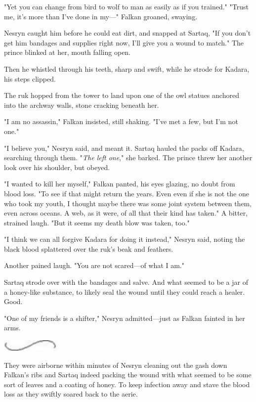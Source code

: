 "Yet you can change from bird to wolf to man as easily as if you trained." "Trust me, it's more than I've done in my---" Falkan groaned, swaying.

Nesryn caught him before he could eat dirt, and snapped at Sartaq, "If you don't get him bandages and supplies right now, I'll give you a wound to match." The prince blinked at her, mouth falling open.

Then he whistled through his teeth, sharp and swift, while he strode for Kadara, his steps clipped.

The ruk hopped from the tower to land upon one of the owl statues anchored into the archway walls, stone cracking beneath her.

"I am no assassin," Falkan insisted, still shaking. "I've met a few, but I'm not one."

"I believe you," Nesryn said, and meant it. Sartaq hauled the packs off Kadara, searching through them. "\emph{The left one}," she barked. The prince threw her another look over his shoulder, but obeyed.

"I wanted to kill her myself," Falkan panted, his eyes glazing, no doubt from blood loss. "To see if  that might return the years. Even  even if she is not the one who took my youth, I thought maybe there was some  joint system between them, even across oceans. A web, as it were, of all that their kind has taken." A bitter, strained laugh. "But it seems my death blow was taken, too."

"I think we can all forgive Kadara for doing it instead," Nesryn said, noting the black blood splattered over the ruk's beak and feathers.

Another pained laugh. "You are not scared---of what I am."

Sartaq strode over with the bandages and salve. And what seemed to be a jar of a honey-like substance, to likely seal the wound until they could reach a healer. Good.

"One of my friends is a shifter," Nesryn admitted---just as Falkan fainted in her arms.

\includegraphics[width=1.12in,height=0.24in]{images/seperator}

They were airborne within minutes of Nesryn cleaning out the gash down Falkan's ribs and Sartaq indeed packing the wound with what seemed to be some sort of leaves and a coating of honey. To keep infection away and stave the blood loss as they swiftly soared back to the aerie.

